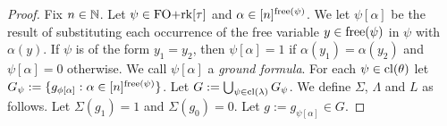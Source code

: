 \documentclass[../paper.tex]{subfiles}
\begin{document}
\begin{proof}

  Fix $n \in \mathbb{N}$. Let $\psi \in \text{\upshape FO+rk}[\tau]$ and $\alpha \in [n]^{\mathrm{free}(\psi)}$. We let $\psi[\alpha]$ be the result of substituting each
  occurrence of the free variable $y \in \mathrm{free}(\psi)$ in $\psi$ with
  $\alpha(y)$. If $\psi$ is of the form $y_1 = y_2$, then $\psi [\alpha] = 1$ if
  $\alpha(y_1) = \alpha (y_2)$ and $\psi[\alpha] = 0$ otherwise. We call
  $\psi[\alpha]$ a \emph{ground formula}. For each $\psi \in \mathrm{cl}(\theta)$ let
  $G_\psi := \{g_{\phi[\alpha]} : \alpha \in [n]^{\mathrm{free}(\psi)} \}$. Let $G :=
  \bigcup_{\psi \in \mathrm{cl}(\lambda)} G_{\psi}$. We define $\Sigma$, $\Lambda$ and
  $L$ as follows. Let $\Sigma (g_1) = 1$ and $\Sigma (g_0) = 0$. Let $g :=
  g_{\psi[\alpha]} \in G$.
  

\end{proof}
\end{document}
